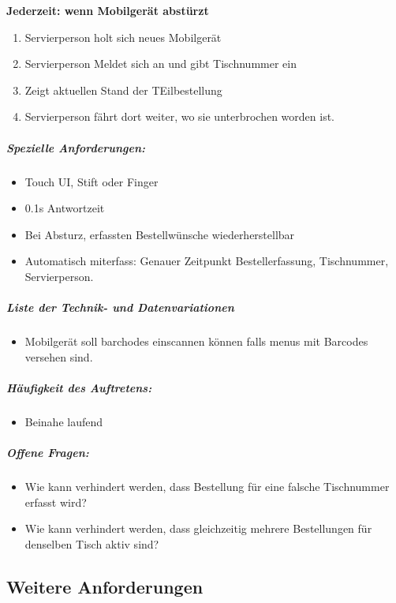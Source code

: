 \documentclass{article}
\begin{document}
\textbf{Jederzeit: wenn Mobilgerät abstürzt}
\begin{enumerate}
	\item Servierperson holt sich neues Mobilgerät
	\item Servierperson Meldet sich an und gibt Tischnummer ein
	\item Zeigt aktuellen Stand der TEilbestellung
	\item Servierperson fährt dort weiter, wo sie unterbrochen worden ist.
\end{enumerate}


\subparagraph{Spezielle Anforderungen: \\}
\begin{itemize}
	\item Touch UI, Stift oder Finger
	\item 0.1s Antwortzeit
	\item Bei Absturz, erfassten Bestellwünsche wiederherstellbar
	\item Automatisch miterfass: Genauer Zeitpunkt Bestellerfassung, Tischnummer, Servierperson.
\end{itemize}



\subparagraph{Liste der Technik- und Datenvariationen\\}

\begin{itemize}
	\item Mobilgerät soll barchodes einscannen können falls menus mit Barcodes versehen sind.
\end{itemize}


\subparagraph{Häufigkeit des Auftretens: \\}
\begin{itemize}
	\item Beinahe laufend
\end{itemize}

\subparagraph{Offene Fragen: \\}

\begin{itemize}
	\item Wie kann verhindert werden, dass Bestellung für eine falsche Tischnummer erfasst 
wird?
	\item Wie kann verhindert werden, dass gleichzeitig mehrere Bestellungen für denselben 
Tisch aktiv sind?

\end{itemize}


\subsection{Weitere Anforderungen}
\end{document}
